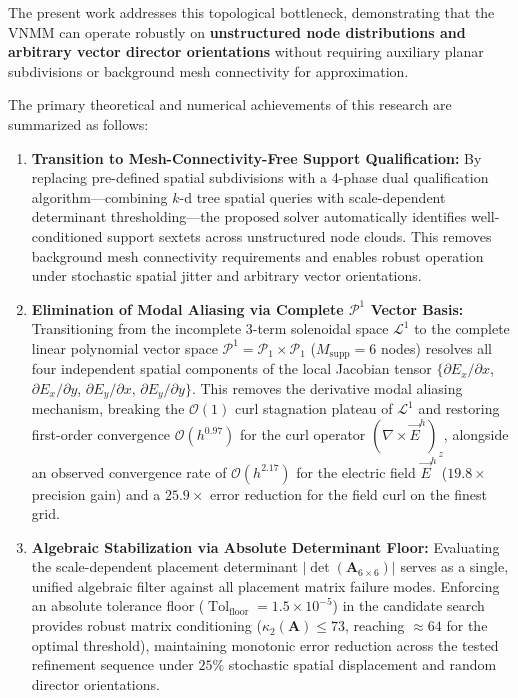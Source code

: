 \documentclass[preprint,12pt]{elsarticle}
\begin{document}
The present work addresses this topological bottleneck, demonstrating that the VNMM can operate robustly on \textbf{unstructured node distributions and arbitrary vector director orientations} without requiring auxiliary planar subdivisions or background mesh connectivity for approximation.

The primary theoretical and numerical achievements of this research are summarized as follows:

\begin{enumerate}
    \item \textbf{Transition to Mesh-Connectivity-Free Support Qualification:} 
    By replacing pre-defined spatial subdivisions with a 4-phase dual qualification algorithm---combining $k$-d tree spatial queries with scale-dependent determinant thresholding---the proposed solver automatically identifies well-conditioned support sextets across unstructured node clouds. This removes background mesh connectivity requirements and enables robust operation under stochastic spatial jitter and arbitrary vector orientations.

    \item \textbf{Elimination of Modal Aliasing via Complete $\mathcal{P}^1$ Vector Basis:} 
    Transitioning from the incomplete 3-term solenoidal space $\mathcal{L}^1$ to the complete linear polynomial vector space $\mathcal{P}^1 = \mathcal{P}_1 \times \mathcal{P}_1$ ($M_{\mathrm{supp}} = 6$ nodes) resolves all four independent spatial components of the local Jacobian tensor $\{\partial E_x/\partial x$, $\partial E_x/\partial y$, $\partial E_y/\partial x$, $\partial E_y/\partial y\}$. This removes the derivative modal aliasing mechanism, breaking the $\mathcal{O}(1)$ curl stagnation plateau of $\mathcal{L}^1$ and restoring first-order convergence $\mathcal{O}(h^{0.97})$ for the curl operator $(\nabla \times \vec{E}^h)_z$, alongside an observed convergence rate of $\mathcal{O}(h^{2.17})$ for the electric field $\vec{E}^h$ ($19.8\times$ precision gain) and a $25.9\times$ error reduction for the field curl on the finest grid.

    \item \textbf{Algebraic Stabilization via Absolute Determinant Floor:} 
    Evaluating the scale-dependent placement determinant $|\det(\mathbf{A}_{6 \times 6})|$ serves as a single, unified algebraic filter against all placement matrix failure modes. Enforcing an absolute tolerance floor ($\operatorname{Tol}_{\mathrm{floor}} = 1.5 \times 10^{-5}$) in the candidate search provides robust matrix conditioning ($\kappa_2(\mathbf{A}) \le 73$, reaching $\approx 64$ for the optimal threshold), maintaining monotonic error reduction across the tested refinement sequence under $25\%$ stochastic spatial displacement and random director orientations.


\end{enumerate}
\end{document}
